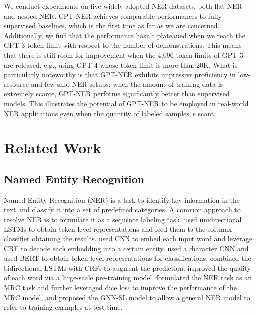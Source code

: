 \documentclass{article}
\begin{document}
We conduct experiments on five widely-adopted NER datasets, both flat NER and nested NER. 
GPT-NER achieves comparable performances to fully supervised baselines, which is the first time as far as we are concerned.
Additionally, 
we find that the performance hasn't plateaued when we reach the GPT-3 token limit with respect to the number of demonstrations. 
This means that 
there is still room for improvement
when the 4,096 token limits of GPT-3 are released, e.g., using GPT-4 whose token limit is more than 20K.
What is particularly noteworthy is that GPT-NER exhibits impressive proficiency in low-resource and few-shot NER setups: when the amount of training data is extremely scarce,  GPT-NER performs significantly better than supervised models.
This illustrates the potential of GPT-NER to be employed in real-world NER applications even when the quantity of labeled samples is scant.


\section{Related Work}

\subsection{Named Entity Recognition}
Named Entity Recognition (NER) is a task to identify key information in the text and classify it into a set of predefined categories. A common approach
to resolve NER is to 
 formulate it as a sequence labeling task. \citet{hammerton2003named} used unidirectional LSTMs to obtain token-level representations and feed them to the softmax classifier obtaining the results. 
 \citet{collobert2011natural} used CNN to embed each input word and leverage CRF to decode each embedding into a certain entity.
   \citet{chiu2016named} used a character CNN  
  and \citet{devlin2018bert} used BERT to obtain token-level representations for classifications. 
  \citet{lample2016neural} combined the bidirectional LSTMs with CRFs to augment the prediction. 
  \citet{sarzynska2021detecting} improved the quality of each word via a large-scale pre-training model.
  \citet{li2019unified, li2019dice} formulated the NER task as an MRC task and further leveraged dice loss to improve the performance of the MRC model, and \citet{wang2022gnn} proposed the GNN-SL model to allow a general NER model to refer to training examples at test time.
\end{document}
